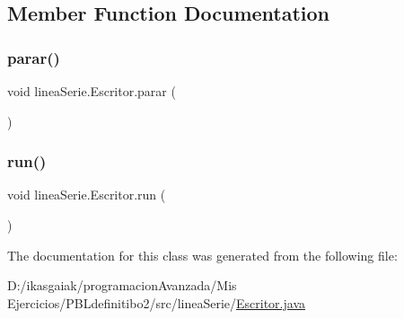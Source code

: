 \subsection{Member Function Documentation}
\mbox{\label{classlinea_serie_1_1_escritor_a4c82dc2897731863d24462db58f451c7}} 
\subsubsection{\texorpdfstring{parar()}{parar()}}
{\footnotesize\ttfamily void linea\+Serie.\+Escritor.\+parar (\begin{DoxyParamCaption}{ }\end{DoxyParamCaption})}

\mbox{\label{classlinea_serie_1_1_escritor_acc8b34e63eaf42d3ce0b12f274f50fd3}} 
\subsubsection{\texorpdfstring{run()}{run()}}
{\footnotesize\ttfamily void linea\+Serie.\+Escritor.\+run (\begin{DoxyParamCaption}{ }\end{DoxyParamCaption})}



The documentation for this class was generated from the following file\+:\begin{DoxyCompactItemize}
\item 
D\+:/ikasgaiak/programacion\+Avanzada/\+Mis Ejercicios/\+P\+B\+Ldefinitibo2/src/linea\+Serie/\mbox{\hyperlink{_escritor_8java}{Escritor.\+java}}\end{DoxyCompactItemize}
